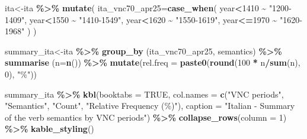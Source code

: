 \documentclass[
]{article}
\newenvironment{Shaded}{\begin{snugshade}}{\end{snugshade}}
\newcommand{\AttributeTok}[1]{\textcolor[rgb]{0.13,0.29,0.53}{#1}}
\newcommand{\ConstantTok}[1]{\textcolor[rgb]{0.56,0.35,0.01}{#1}}
\newcommand{\DecValTok}[1]{\textcolor[rgb]{0.00,0.00,0.81}{#1}}
\newcommand{\FunctionTok}[1]{\textcolor[rgb]{0.13,0.29,0.53}{\textbf{#1}}}
\newcommand{\NormalTok}[1]{#1}
\newcommand{\OtherTok}[1]{\textcolor[rgb]{0.56,0.35,0.01}{#1}}
\newcommand{\SpecialCharTok}[1]{\textcolor[rgb]{0.81,0.36,0.00}{\textbf{#1}}}
\newcommand{\StringTok}[1]{\textcolor[rgb]{0.31,0.60,0.02}{#1}}
\begin{document}
\begin{Shaded}
\begin{Highlighting}[]
\NormalTok{ita}\OtherTok{\textless{}{-}}\NormalTok{ita }\SpecialCharTok{\%\textgreater{}\%} 
  \FunctionTok{mutate}\NormalTok{(}
    \AttributeTok{ita\_vnc70\_apr25=}\FunctionTok{case\_when}\NormalTok{(}
\NormalTok{      year}\SpecialCharTok{\textless{}}\DecValTok{1410} \SpecialCharTok{\textasciitilde{}} \StringTok{"1200{-}1409"}\NormalTok{,}
\NormalTok{      year}\SpecialCharTok{\textless{}}\DecValTok{1550} \SpecialCharTok{\textasciitilde{}} \StringTok{"1410{-}1549"}\NormalTok{,}
\NormalTok{      year}\SpecialCharTok{\textless{}}\DecValTok{1620} \SpecialCharTok{\textasciitilde{}} \StringTok{"1550{-}1619"}\NormalTok{,}
\NormalTok{      year}\SpecialCharTok{\textless{}=}\DecValTok{1970} \SpecialCharTok{\textasciitilde{}} \StringTok{"1620{-}1968"}
\NormalTok{    )}
\NormalTok{  )}

\NormalTok{summary\_ita}\OtherTok{\textless{}{-}}\NormalTok{ita }\SpecialCharTok{\%\textgreater{}\%}
  \FunctionTok{group\_by}\NormalTok{ (ita\_vnc70\_apr25, semantics) }\SpecialCharTok{\%\textgreater{}\%}
  \FunctionTok{summarise}\NormalTok{ (}\AttributeTok{n=}\FunctionTok{n}\NormalTok{()) }\SpecialCharTok{\%\textgreater{}\%}
  \FunctionTok{mutate}\NormalTok{(}\AttributeTok{rel.freq =} \FunctionTok{paste0}\NormalTok{(}\FunctionTok{round}\NormalTok{(}\DecValTok{100} \SpecialCharTok{*}\NormalTok{ n}\SpecialCharTok{/}\FunctionTok{sum}\NormalTok{(n), }\DecValTok{0}\NormalTok{), }\StringTok{"\%"}\NormalTok{))}

\NormalTok{summary\_ita }\SpecialCharTok{\%\textgreater{}\%}  \FunctionTok{kbl}\NormalTok{(}\AttributeTok{booktabs =} \ConstantTok{TRUE}\NormalTok{, }\AttributeTok{col.names =} \FunctionTok{c}\NormalTok{(}\StringTok{"VNC periods"}\NormalTok{, }\StringTok{"Semantics"}\NormalTok{, }\StringTok{"Count"}\NormalTok{, }\StringTok{"Relative Frequency (\%)"}\NormalTok{), }\AttributeTok{caption =} \StringTok{"Italian {-} Summary of the verb semantics by VNC periods"}\NormalTok{) }\SpecialCharTok{\%\textgreater{}\%}
   \FunctionTok{collapse\_rows}\NormalTok{(}\AttributeTok{column =} \DecValTok{1}\NormalTok{) }\SpecialCharTok{\%\textgreater{}\%} 
  \FunctionTok{kable\_styling}\NormalTok{() }
\end{Highlighting}
\end{Shaded}
\end{document}
